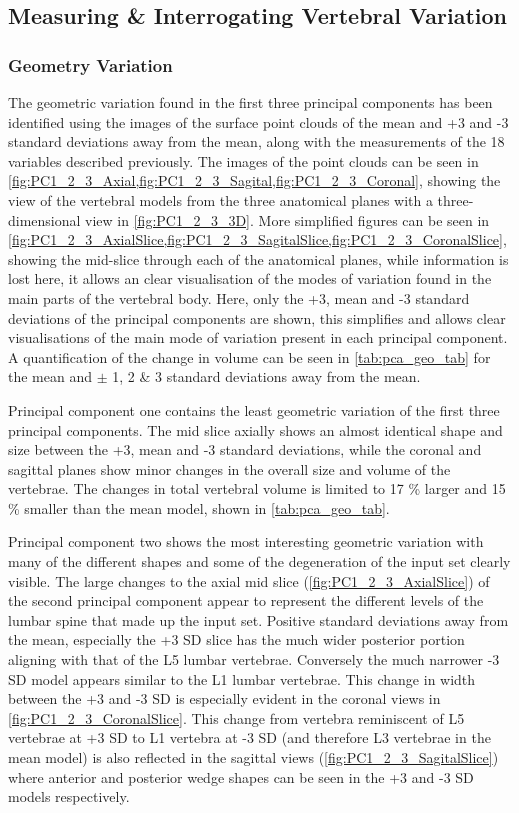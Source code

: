 \subsection{Measuring \& Interrogating Vertebral Variation}

\subsubsection{Geometry Variation}

The geometric variation found in the first three principal components has been
identified using the images of the surface point clouds of the mean and +3 and
-3 standard deviations away from the mean, along with the measurements of the
18 variables described previously.  The images of the point clouds can be seen
in \cref{fig:PC1_2_3_Axial,fig:PC1_2_3_Sagital,fig:PC1_2_3_Coronal}, showing
the view of the vertebral models from the three anatomical planes with a
three-dimensional view in \cref{fig:PC1_2_3_3D}.  More simplified figures can
be seen in
\cref{fig:PC1_2_3_AxialSlice,fig:PC1_2_3_SagitalSlice,fig:PC1_2_3_CoronalSlice},
showing the mid-slice through each of the anatomical planes, while information
is lost here, it allows an clear visualisation of the modes of variation found
in the main parts of the vertebral body.  Here, only the +3, mean and -3
standard deviations of the principal components are shown, this simplifies and
allows clear visualisations of the main mode of variation present in each
principal component.  A quantification of the change in volume can be seen in
\cref{tab:pca_geo_tab} for the mean and $\pm$ 1, 2 \& 3 standard deviations
away from the mean.

Principal component one contains the least geometric variation of the first
three principal components.  The mid slice axially shows an almost identical
shape and size between the +3, mean and -3 standard deviations, while the
coronal and sagittal planes show minor changes in the overall size and volume
of the vertebrae.  The changes in total vertebral volume is limited to 17 \%
larger and 15 \% smaller than the mean model, shown in \cref{tab:pca_geo_tab}.

Principal component two shows the most interesting geometric variation with
many of the different shapes and some of the degeneration of the input set
clearly visible.  The large changes to the axial mid slice
(\cref{fig:PC1_2_3_AxialSlice}) of the second principal component appear to
represent the different levels of the lumbar spine that made up the input set.
Positive standard deviations away from the mean, especially the +3 SD slice has
the much wider posterior portion aligning with that of the L5 lumbar vertebrae.
Conversely the much narrower -3 SD model appears similar to the L1 lumbar
vertebrae.  This change in width between the +3 and -3 SD is especially evident
in the coronal views in \cref{fig:PC1_2_3_CoronalSlice}.  This change from
vertebra reminiscent of L5 vertebrae at +3 SD to L1 vertebra at -3 SD (and
therefore L3 vertebrae in the mean model) is also reflected in the sagittal
views (\cref{fig:PC1_2_3_SagitalSlice}) where anterior and posterior wedge
shapes can be seen in the +3 and -3 SD models respectively.

